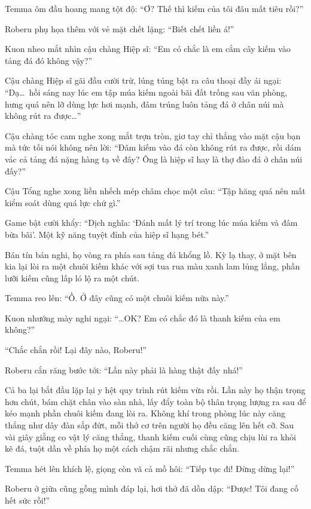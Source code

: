 \documentclass[../main.tex]{subfiles}
\begin{document}
Temma ôm đầu hoang mang tột độ: ``Ơ? Thế thì kiếm của tôi đâu mất tiêu rồi?''

Roberu phụ họa thêm với vẻ mặt chết lặng: ``Biết chết liền á!''

Kuon nheo mắt nhìn cậu chàng Hiệp sĩ: ``Em có chắc là em cắm cây kiếm vào tảng đá đó không vậy?''

Cậu chàng Hiệp sĩ gãi đầu cười trừ, lúng túng bật ra câu thoại đầy ái ngại: ``Dạ\dots\ hồi sáng nay lúc em tập múa kiếm ngoài bãi đất trống sau văn phòng, hưng quá nên lỡ dùng lực hơi mạnh, đâm trúng luôn tảng đá ở chân núi mà không rút ra được\dots''

Cậu chàng tóc cam nghe xong mắt trợn tròn, giơ tay chỉ thẳng vào mặt cậu bạn mà tức tối nói không nên lời: ``Đâm kiếm vào đá còn không rút ra được, rồi dám vác cả tảng đá nặng hàng tạ về đây? Ông là hiệp sĩ hay là thợ đào đá ở chân núi đấy?''

Cậu Tổng nghe xong liền nhếch mép châm chọc một câu: ``Tập hăng quá nên mất kiểm soát dùng quá lực chứ gì.''

Game bật cười khẩy: ``Dịch nghĩa: `Đánh mất lý trí trong lúc múa kiếm và đâm bừa bãi'. Một kỹ năng tuyệt đỉnh của hiệp sĩ hạng bét.''

Bán tín bán nghi, họ vòng ra phía sau tảng đá khổng lồ. Kỳ lạ thay, ở mặt bên kia lại lòi ra một chuôi kiếm khác với sợi tua rua màu xanh lam lủng lẳng, phần lưỡi kiếm cũng lấp ló lộ ra một chút.


Temma reo lên: ``Ồ. Ở đây cũng có một chuôi kiếm nữa này.''

Kuon nhướng mày nghi ngại: ``\dots OK? Em có chắc đó là thanh kiếm của em không?''

``Chắc chắn rồi! Lại đây nào, Roberu!''

Roberu cắn răng bước tới: ``Lần này phải là hàng thật đấy nhá!''

Cả ba lại bắt đầu lặp lại y hệt quy trình rút kiếm vừa rồi. Lần này họ thận trọng hơn chút, bám chặt chân vào sàn nhà, lấy đẩy toàn bộ thân trọng lượng ra sau để kéo mạnh phần chuôi kiếm đang lòi ra. Không khí trong phòng lúc này căng thẳng như dây đàn sắp đứt, mỗi thớ cơ trên người họ đều căng lên hết cỡ. Sau vài giây giằng co vật lý căng thẳng, thanh kiếm cuối cùng cũng chịu lùi ra khỏi kẽ đá, tuột dần về phía họ một cách chậm rãi nhưng chắc chắn.

Temma hét lên khích lệ, giọng còn vã cả mồ hôi: ``Tiếp tục đi! Đừng dừng lại!''

Roberu ở giữa cũng gồng mình đáp lại, hơi thở đã dồn dập: ``Được! Tôi đang cố hết sức rồi!''
\end{document}
